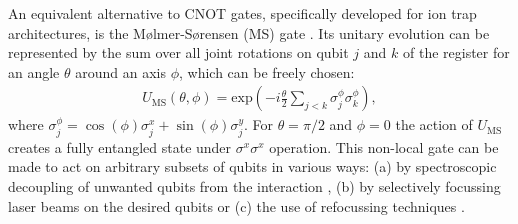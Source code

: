 \documentclass[superscriptaddress,aps,pra,twocolumn,nofootinbib,babel]{revtex4-1}
\begin{document}
An equivalent alternative to CNOT gates, specifically developed for ion trap architectures, is the M{\o}lmer-S{\o}rensen (MS) gate  \cite{Sorensen.PRL.82.1971.1999,Sorensen.PRA.62.22311.2000}. Its unitary evolution can be represented by the sum over all joint rotations on qubit $j$ and $k$ of the register for an angle $\theta$ around an  axis $\phi$, which can be freely chosen:
\begin{align}
U_\mathrm{MS}(\theta,\phi)=\mathrm{exp}\left(-i\frac{\theta}{2}\sum_{j<k} \sigma_{j}^{\phi} \sigma_{k}^{\phi} \right),
\end{align}
where  $\sigma_{j}^{\phi}=\cos(\phi)\sigma_{j}^{x}+\sin(\phi)\sigma_{j}^{y}$. For $\theta = \pi/2$ and $\phi=0$ the action of $U_\mathrm{MS}$ creates a fully entangled state under $\sigma^x\sigma^x$ operation. This non-local gate can be made to act on  arbitrary subsets of qubits in various ways: (a) by spectroscopic decoupling of unwanted qubits from the interaction \cite{Schindler:2013}, (b) by selectively focussing laser beams on the desired qubits \cite{Debnath:2016} or (c) the use of refocussing techniques \cite{Mueller.NJP.13.85007.2011}.
\end{document}
